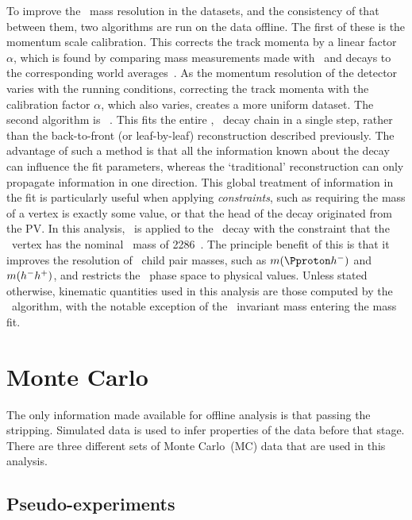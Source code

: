 To improve the \PLambdac\ mass resolution in the datasets, and the consistency 
of that between them, two algorithms are run on the data offline.
The first of these is the momentum scale calibration.
This corrects the track momenta by a linear factor $\alpha$, which is found by 
comparing mass measurements made with \JpsiTomumu\ and 
\decay{\PBplus}{\PJpsi\PKplus} decays to the corresponding world 
averages~\cite{Aaij:2014jba}.
As the momentum resolution of the detector varies with the running conditions, 
correcting the track momenta with the calibration factor $\alpha$, which also 
varies, creates a more uniform dataset.
The second algorithm is \decaytreefitter~\cite{Hulsbergen:2005pu}.
This fits the entire \LbToLcmuX, \LcTophh\ decay chain in a single step, rather 
than the back-to-front (or leaf-by-leaf) reconstruction described previously.
The advantage of such a method is that all the information known about the 
decay can influence the fit parameters, whereas the `traditional' 
reconstruction can only propagate information in one direction.
This global treatment of information in the fit is particularly useful when 
applying \emph{constraints}, such as requiring the mass of a vertex is exactly 
some value, or that the head of the decay originated from the \ac{PV}.
In this analysis, \decaytreefitter\ is applied to the \PLambdab\ decay with the 
constraint that the \phh\ vertex has the nominal \PLambdac\ mass of 
\SI{2286}{\MeVcc}~\cite{PDG2014}.
The principle benefit of this is that it improves the resolution of \PLambdac\ 
child pair masses, such as $m(\phm)$ and $m(h^{-}h^{+})$, and restricts the 
\PLambdac\ phase space to physical values.
Unless stated otherwise, kinematic quantities used in this analysis are those 
computed by the \decaytreefitter\ algorithm, with the notable exception of the 
\phh\ invariant mass entering the mass fit.

\section{Monte Carlo}
\label{sec:data:mc}

The only information made available for offline analysis is that passing the 
stripping.
Simulated data is used to infer properties of the data before that stage.
There are three different sets of Monte Carlo~(MC) data that are used in this 
analysis.

\subsection{Pseudo-experiments}
\label{chap:cpv:data:mc:toy}

